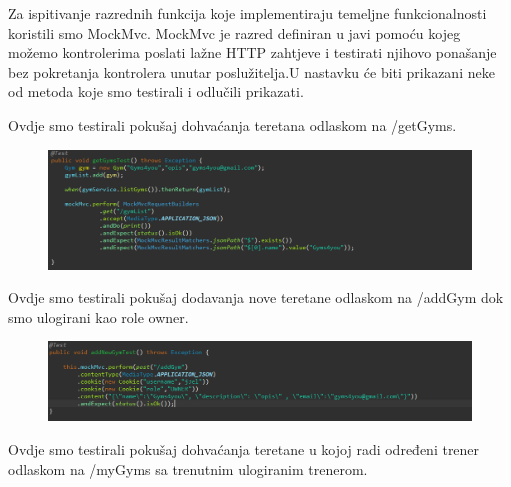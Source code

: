 			Za ispitivanje razrednih funkcija koje implementiraju temeljne funkcionalnosti koristili smo MockMvc. MockMvc je razred definiran u javi pomoću kojeg možemo kontrolerima poslati lažne HTTP zahtjeve i testirati njihovo  ponašanje bez pokretanja kontrolera unutar poslužitelja.U nastavku će biti prikazani neke od metoda koje smo testirali i odlučili prikazati.
			
			 \noindent {}
			 
             Ovdje smo testirali pokušaj dohvaćanja teretana odlaskom na /getGyms.

			\begin{figure}[H]
    			\hspace*{-1.5cm}
    			\includegraphics[scale=0.5]{slike/getGyms.PNG} %
    			\centering
    			\label{fig:promjene}
    	    \end{figure}
	

			\noindent {}
			
            Ovdje smo testirali pokušaj dodavanja nove teretane odlaskom na /addGym  dok smo ulogirani kao role owner.

			\begin{figure}[H]
    			\hspace*{-1.5cm}
    			\includegraphics[scale=0.5]{slike/addNewGym.PNG} %
    			\centering
    			\label{fig:promjene}
    	    \end{figure}
	

			\noindent {}
			
			Ovdje smo testirali pokušaj dohvaćanja teretane u kojoj radi određeni trener odlaskom na /myGyms sa trenutnim ulogiranim trenerom.

